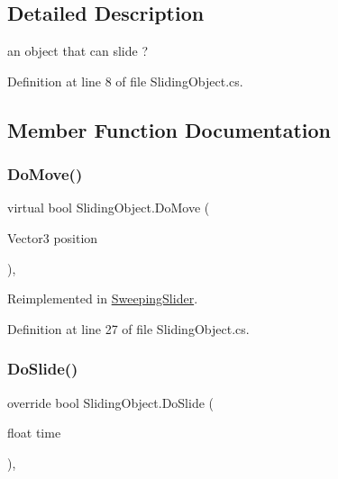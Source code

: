 \subsection{Detailed Description}
an object that can slide ? 



Definition at line 8 of file Sliding\+Object.\+cs.



\subsection{Member Function Documentation}
\mbox{\label{class_sliding_object_ab5a9f4c9a30b3fd106f9c4ea9218d679}} 
\subsubsection{\texorpdfstring{Do\+Move()}{DoMove()}}
{\footnotesize\ttfamily virtual bool Sliding\+Object.\+Do\+Move (\begin{DoxyParamCaption}\item[{Vector3}]{position }\end{DoxyParamCaption})\hspace{0.3cm}{\ttfamily [protected]}, {\ttfamily [virtual]}}



Reimplemented in \mbox{\hyperlink{class_sweeping_slider_aded891966e0230cae066605d1d5aaf78}{Sweeping\+Slider}}.



Definition at line 27 of file Sliding\+Object.\+cs.

\mbox{\label{class_sliding_object_a5da98cd763d752b6a7378d181b35f3d0}} 
\subsubsection{\texorpdfstring{Do\+Slide()}{DoSlide()}}
{\footnotesize\ttfamily override bool Sliding\+Object.\+Do\+Slide (\begin{DoxyParamCaption}\item[{float}]{time }\end{DoxyParamCaption})\hspace{0.3cm}{\ttfamily [protected]}, {\ttfamily [virtual]}}



